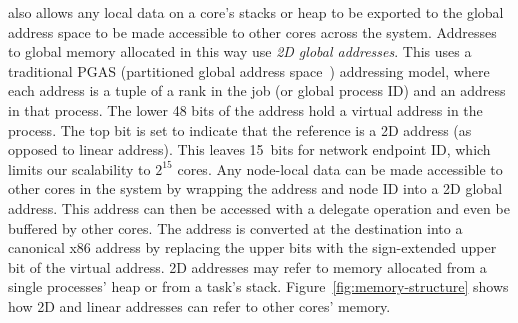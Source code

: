 \Grappa also allows any local data on a core's stacks or heap to be exported
to the global address space to be made accessible to other cores across the
system. Addresses to global memory allocated in this way use \emph{2D global
addresses}. This uses a traditional PGAS (partitioned global address
space~\cite{upc:2005}) addressing model, where each address is a tuple of a
rank in the job (or global process ID) and an address in that process. The
lower 48 bits of the address hold a virtual address in the process. The top
bit is set to indicate that the reference is a 2D address (as opposed to
linear address). This leaves 15~bits for network endpoint ID, which limits our
scalability to $2^{15}$ cores. Any node-local data can be made accessible
to other cores in the system by wrapping the address and node ID into a 2D
global address. This address can then be accessed with a delegate operation
and even be buffered by other cores. The address is converted at the destination
into a canonical x86 address by replacing the upper bits with the
sign-extended upper bit of the virtual address. 2D addresses may refer to
memory allocated from a single processes' heap or from a task's stack.
Figure~\ref{fig:memory-structure} shows how 2D and linear addresses can refer
to other cores' memory.


